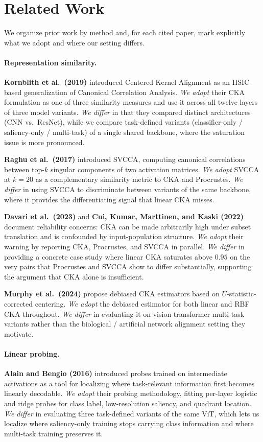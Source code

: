 \documentclass{article}
\begin{document}
\section{Related Work}

We organize prior work by method and, for each cited paper, mark explicitly what we adopt and where our setting differs.

\paragraph{Representation similarity.}
\textbf{Kornblith et al.\ (2019)} introduced Centered Kernel Alignment as an HSIC-based generalization of Canonical Correlation Analysis. \emph{We adopt} their CKA formulation as one of three similarity measures and use it across all twelve layers of three model variants. \emph{We differ} in that they compared distinct architectures (CNN vs.\ ResNet), while we compare task-defined variants (classifier-only / saliency-only / multi-task) of a single shared backbone, where the saturation issue is more pronounced.

\textbf{Raghu et al.\ (2017)} introduced SVCCA, computing canonical correlations between top-$k$ singular components of two activation matrices. \emph{We adopt} SVCCA at $k = 20$ as a complementary similarity metric to CKA and Procrustes. \emph{We differ} in using SVCCA to discriminate between variants of the same backbone, where it provides the differentiating signal that linear CKA misses.

\textbf{Davari et al.\ (2023)} and \textbf{Cui, Kumar, Marttinen, and Kaski (2022)} document reliability concerns: CKA can be made arbitrarily high under subset translation and is confounded by input-population structure. \emph{We adopt} their warning by reporting CKA, Procrustes, and SVCCA in parallel. \emph{We differ} in providing a concrete case study where linear CKA saturates above $0.95$ on the very pairs that Procrustes and SVCCA show to differ substantially, supporting the argument that CKA alone is insufficient.

\textbf{Murphy et al.\ (2024)} propose debiased CKA estimators based on $U$-statistic-corrected centering. \emph{We adopt} the debiased estimator for both linear and RBF CKA throughout. \emph{We differ} in evaluating it on vision-transformer multi-task variants rather than the biological / artificial network alignment setting they motivate.

\paragraph{Linear probing.}
\textbf{Alain and Bengio (2016)} introduced probes trained on intermediate activations as a tool for localizing where task-relevant information first becomes linearly decodable. \emph{We adopt} their probing methodology, fitting per-layer logistic and ridge probes for class label, low-resolution saliency, and quadrant location. \emph{We differ} in evaluating three task-defined variants of the same ViT, which lets us localize where saliency-only training stops carrying class information and where multi-task training preserves it.
\end{document}
